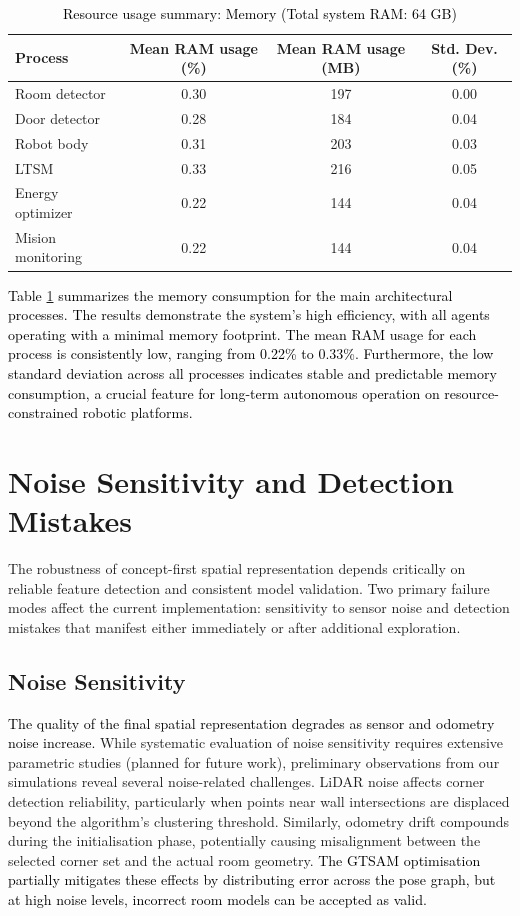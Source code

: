 \documentclass[10pt,a4paper]{article}
\begin{document}
%
%
\begin{table}[h!]
\centering
\caption{\textcolor{black}{Resource usage summary: Memory (Total system RAM: 64 GB)}}
\label{tab:ram_summary}

\begin{tabular}{|l|c|c|c|}
\hline
\textbf{Process} & \textbf{Mean RAM usage (\%)} & \textbf{Mean RAM usage (MB)} & \textbf{Std. Dev. (\%)} \\
\hline
Room detector & 0.30 & 197 & 0.00 \\
Door detector & 0.28 & 184 & 0.04 \\
Robot body & 0.31 & 203 & 0.03 \\
LTSM & 0.33 & 216 & 0.05 \\
Energy optimizer & 0.22 & 144 & 0.04 \\
Mision monitoring & 0.22 & 144 & 0.04 \\
\hline
\end{tabular}
\end{table}
%

\textcolor{black}{Table \ref{tab:ram_summary} summarizes the memory consumption for the main architectural processes. The results demonstrate the system's high efficiency, with all agents operating with a minimal memory footprint. The mean RAM usage for each process is consistently low, ranging from 0.22\% to 0.33\%. Furthermore, the low standard deviation across all processes indicates stable and predictable memory consumption, a crucial feature for long-term autonomous operation on resource-constrained robotic platforms.}




\section{Noise Sensitivity and Detection Mistakes}

The robustness of concept-first spatial representation depends critically on reliable feature detection and consistent model validation. Two primary failure modes affect the current implementation: sensitivity to sensor noise and detection mistakes that manifest either immediately or after additional exploration.

\subsection{Noise Sensitivity}

\textcolor{black}{The quality of the final spatial representation degrades as sensor and odometry noise increase.} While systematic evaluation of noise sensitivity requires extensive parametric studies (planned for future work), preliminary observations from our simulations reveal several noise-related challenges. LiDAR noise affects corner detection reliability, particularly when points near wall intersections are displaced beyond the algorithm's clustering threshold. Similarly, odometry drift compounds during the initialisation phase, potentially causing misalignment between the selected corner set and the actual room geometry. \textcolor{black}{The GTSAM optimisation partially mitigates these effects by distributing error across the pose graph, but at high noise levels, incorrect room models can be accepted as valid.}
\end{document}
